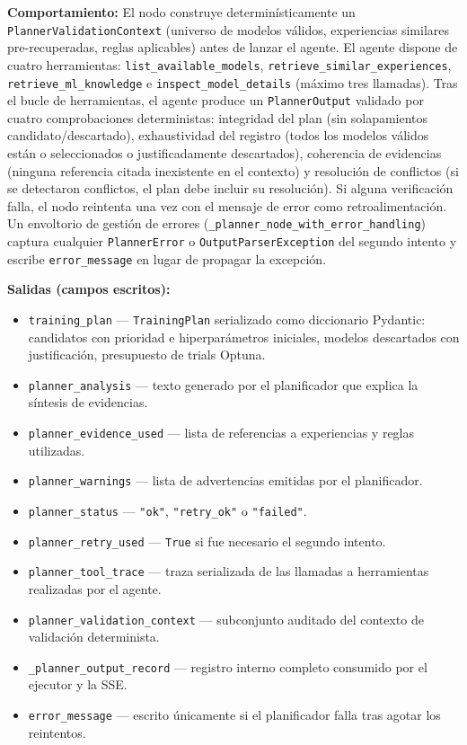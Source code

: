 \textbf{Comportamiento:} El nodo construye determinísticamente un \texttt{PlannerValidationContext} (universo de modelos válidos, experiencias similares pre-recuperadas, reglas aplicables) antes de lanzar el agente. El agente dispone de cuatro herramientas: \texttt{list\_available\_models}, \texttt{retrieve\_similar\_experiences}, \texttt{retrieve\_ml\_knowledge} e \texttt{inspect\_model\_details} (máximo tres llamadas). Tras el bucle de herramientas, el agente produce un \texttt{PlannerOutput} validado por cuatro comprobaciones deterministas: integridad del plan (sin solapamientos candidato/descartado), exhaustividad del registro (todos los modelos válidos están o seleccionados o justificadamente descartados), coherencia de evidencias (ninguna referencia citada inexistente en el contexto) y resolución de conflictos (si se detectaron conflictos, el plan debe incluir su resolución). Si alguna verificación falla, el nodo reintenta una vez con el mensaje de error como retroalimentación. Un envoltorio de gestión de errores (\texttt{\_planner\_node\_with\_error\_handling}) captura cualquier \texttt{PlannerError} o \texttt{OutputParserException} del segundo intento y escribe \texttt{error\_message} en lugar de propagar la excepción.

\textbf{Salidas (campos escritos):}
\begin{itemize}
  \item \texttt{training\_plan} — \texttt{TrainingPlan} serializado como diccionario Pydantic: candidatos con prioridad e hiperparámetros iniciales, modelos descartados con justificación, presupuesto de trials Optuna.
  \item \texttt{planner\_analysis} — texto generado por el planificador que explica la síntesis de evidencias.
  \item \texttt{planner\_evidence\_used} — lista de referencias a experiencias y reglas utilizadas.
  \item \texttt{planner\_warnings} — lista de advertencias emitidas por el planificador.
  \item \texttt{planner\_status} — \texttt{"ok"}, \texttt{"retry\_ok"} o \texttt{"failed"}.
  \item \texttt{planner\_retry\_used} — \texttt{True} si fue necesario el segundo intento.
  \item \texttt{planner\_tool\_trace} — traza serializada de las llamadas a herramientas realizadas por el agente.
  \item \texttt{planner\_validation\_context} — subconjunto auditado del contexto de validación determinista.
  \item \texttt{\_planner\_output\_record} — registro interno completo consumido por el ejecutor y la SSE.
  \item \texttt{error\_message} — escrito únicamente si el planificador falla tras agotar los reintentos.
\end{itemize}


